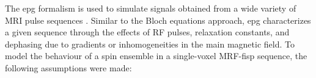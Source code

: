 The \ac{epg} formalism \cite{Hennig1988} \cite{Hennig1991} \cite{Weigel2015} is used to simulate signals obtained from a wide variety of MRI pulse sequences \cite{Malik2017}.
Similar to the Bloch equations approach, \ac{epg} characterizes a given sequence through the effects of RF pulses, relaxation constants, and dephasing due to gradients or inhomogeneities in the main magnetic field.
To model the behaviour of a spin ensemble 
in a single-voxel MRF-\ac{fisp} sequence, the following assumptions were made:



